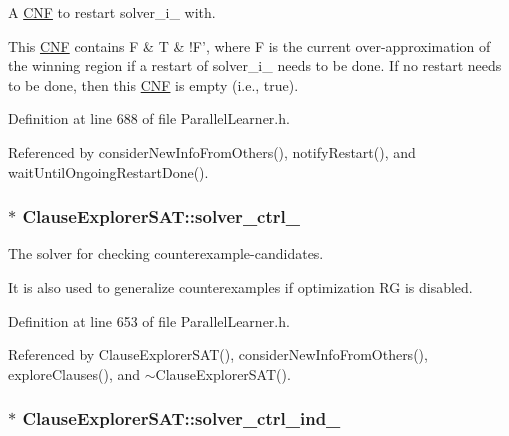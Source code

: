 A \hyperlink{classCNF}{C\-N\-F} to restart solver\-\_\-i\-\_\- with. 

This \hyperlink{classCNF}{C\-N\-F} contains F \& T \& !\-F', where F is the current over-\/approximation of the winning region if a restart of solver\-\_\-i\-\_\- needs to be done. If no restart needs to be done, then this \hyperlink{classCNF}{C\-N\-F} is empty (i.\-e., true). 

Definition at line 688 of file Parallel\-Learner.\-h.



Referenced by consider\-New\-Info\-From\-Others(), notify\-Restart(), and wait\-Until\-Ongoing\-Restart\-Done().

\hypertarget{classClauseExplorerSAT_a7884d171120e8397140e30fdc28767eb}{
\subsubsection[{solver\-\_\-ctrl\-\_\-}]{$\ast$ Clause\-Explorer\-S\-A\-T\-::solver\-\_\-ctrl\-\_\-\hspace{0.3cm}{\ttfamily [protected]}}}\label{classClauseExplorerSAT_a7884d171120e8397140e30fdc28767eb}


The solver for checking counterexample-\/candidates. 

It is also used to generalize counterexamples if optimization R\-G is disabled. 

Definition at line 653 of file Parallel\-Learner.\-h.



Referenced by Clause\-Explorer\-S\-A\-T(), consider\-New\-Info\-From\-Others(), explore\-Clauses(), and $\sim$\-Clause\-Explorer\-S\-A\-T().

\hypertarget{classClauseExplorerSAT_aba4c9ed8ccc28d89c094f3cd80157f3f}{
\subsubsection[{solver\-\_\-ctrl\-\_\-ind\-\_\-}]{$\ast$ Clause\-Explorer\-S\-A\-T\-::solver\-\_\-ctrl\-\_\-ind\-\_\-\hspace{0.3cm}{\ttfamily [protected]}}}\label{classClauseExplorerSAT_aba4c9ed8ccc28d89c094f3cd80157f3f}


